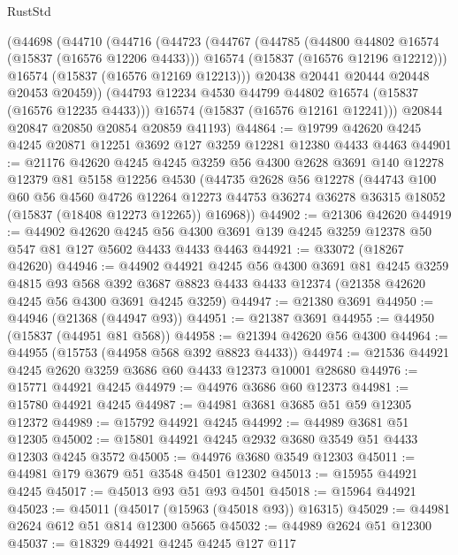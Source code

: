 \begin{lexlean}{RustStd}
\begin{coremodule}
    (@44698
      (@44710
        (@44716
          (@44723
            (@44767
              (@44785
                (@44800 @44802 @16574 (@15837 (@16576 @12206 @4433)))
                @16574
                (@15837 (@16576 @12196 @12212)))
              @16574
              (@15837 (@16576 @12169 @12213)))
            @20438
            @20441
            @20444
            @20448
            @20453
            @20459))
        (@44793 @12234 @4530 @44799 @44802 @16574 (@15837 (@16576 @12235 @4433)))
        @16574
        (@15837 (@16576 @12161 @12241)))
      @20844
      @20847
      @20850
      @20854
      @20859
      @41193)
@44864 := @19799 @42620 @4245 @4245 @20871 @12251 @3692 @127 @3259 @12281 @12380 @4433 @4463
@44901 := @21176
    @42620
    @4245
    @4245
    @3259
    @56
    @4300
    @2628
    @3691
    @140
    @12278
    @12379
    @81
    @5158
    @12256
    @4530
    (@44735
      @2628
      @56
      @12278
      (@44743
        @100
        @60
        @56
        @4560
        @4726
        @12264
        @12273
        @44753
        @36274
        @36278
        @36315
        @18052
        (@15837 (@18408 @12273 @12265))
        @16968))
@44902 := @21306 @42620
@44919 := @44902
    @42620
    @4245
    @56
    @4300
    @3691
    @139
    @4245
    @3259
    @12378
    @50
    @547
    @81
    @127
    @5602
    @4433
    @4433
    @4463
@44921 := @33072 (@18267 @42620)
@44946 := @44902
    @44921
    @4245
    @56
    @4300
    @3691
    @81
    @4245
    @3259
    @4815
    @93
    @568
    @392
    @3687
    @8823
    @4433
    @4433
    @12374
    (@21358 @42620 @4245 @56 @4300 @3691 @4245 @3259)
@44947 := @21380 @3691
@44950 := @44946 (@21368 (@44947 @93))
@44951 := @21387 @3691
@44955 := @44950 (@15837 (@44951 @81 @568))
@44958 := @21394 @42620 @56 @4300
@44964 := @44955 (@15753 (@44958 @568 @392 @8823 @4433))
@44974 := @21536 @44921 @4245 @2620 @3259 @3686 @60 @4433 @12373 @10001 @28680
@44976 := @15771 @44921 @4245
@44979 := @44976 @3686 @60 @12373
@44981 := @15780 @44921 @4245
@44987 := @44981 @3681 @3685 @51 @59 @12305 @12372
@44989 := @15792 @44921 @4245
@44992 := @44989 @3681 @51 @12305
@45002 := @15801 @44921 @4245 @2932 @3680 @3549 @51 @4433 @12303 @4245 @3572
@45005 := @44976 @3680 @3549 @12303
@45011 := @44981 @179 @3679 @51 @3548 @4501 @12302
@45013 := @15955 @44921 @4245
@45017 := @45013 @93 @51 @93 @4501
@45018 := @15964 @44921
@45023 := @45011 (@45017 (@15963 (@45018 @93)) @16315)
@45029 := @44981 @2624 @612 @51 @814 @12300 @5665
@45032 := @44989 @2624 @51 @12300
@45037 := @18329 @44921 @4245 @4245 @127 @117

\end{coremodule}
\end{lexlean}
